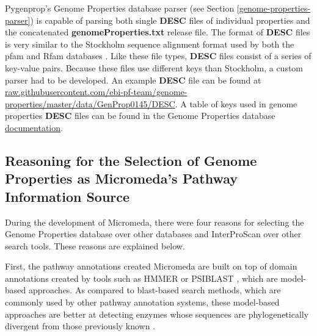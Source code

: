 Pygenprop's Genome Properties database parser (see Section \ref{genome-properties-parser}) is capable of parsing both single \textbf{DESC} files of individual properties and the concatenated \textbf{genomeProperties.txt} release file. The format of \textbf{DESC} files is very similar to the Stockholm sequence alignment format used by both the \gls{pfam} and Rfam databases \cite{bateman2004pfam, griffiths2003rfam}. Like these file types, \textbf{DESC} files consist of a series of key-value pairs. Because these files use different keys than Stockholm, a custom parser had to be developed. An example \textbf{DESC} file can be found at \href{raw.githubusercontent.com/ebi-pf-team/genome-properties/master/data/GenProp0145/DESC}{raw.githubusercontent.com/ebi-pf-team/genome-properties/master/data/GenProp0145/DESC}. A table of keys used in  genome properties \textbf{DESC} files can be found in the Genome Properties database \href{genome-properties.readthedocs.io/en/latest/flatfile.html\#desc-file}{documentation}.

\subsection{Reasoning for the Selection of Genome Properties as Micromeda's Pathway Information Source} \label{reason-for-genome-properties-selection}

During the development of Micromeda, there were four reasons for selecting the Genome Properties database over other databases and InterProScan over other search tools. These reasons are explained below.

First, the pathway annotations created Micromeda are built on top of domain annotations created by tools such as HMMER \cite{eddy2011accelerated} or PSIBLAST \cite{altschul1997gapped}, which are model-based approaches. As compared to \gls{blast}-based \cite{altschul1990basic} search methods, which are commonly used by other pathway annotation systems, these model-based approaches are better at detecting enzymes whose sequences are phylogenetically divergent from those previously known \cite{eddy2011accelerated}.

